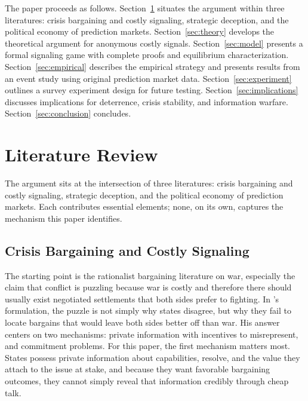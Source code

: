 \documentclass[12pt]{article}
\begin{document}
The paper proceeds as follows. Section~\ref{sec:lit} situates the argument within three literatures: crisis bargaining and costly signaling, strategic deception, and the political economy of prediction markets. Section~\ref{sec:theory} develops the theoretical argument for anonymous costly signals. Section~\ref{sec:model} presents a formal signaling game with complete proofs and equilibrium characterization. Section~\ref{sec:empirical} describes the empirical strategy and presents results from an event study using original prediction market data. Section~\ref{sec:experiment} outlines a survey experiment design for future testing. Section~\ref{sec:implications} discusses implications for deterrence, crisis stability, and information warfare. Section~\ref{sec:conclusion} concludes.


\section{Literature Review}\label{sec:lit}

The argument sits at the intersection of three literatures: crisis bargaining and costly signaling, strategic deception, and the political economy of prediction markets. Each contributes essential elements; none, on its own, captures the mechanism this paper identifies.

\subsection{Crisis Bargaining and Costly Signaling}

The starting point is the rationalist bargaining literature on war, especially the claim that conflict is puzzling because war is costly and therefore there should usually exist negotiated settlements that both sides prefer to fighting. In \citet{fearon1995}'s formulation, the puzzle is not simply why states disagree, but why they fail to locate bargains that would leave both sides better off than war. His answer centers on two mechanisms: private information with incentives to misrepresent, and commitment problems. For this paper, the first mechanism matters most. States possess private information about capabilities, resolve, and the value they attach to the issue at stake, and because they want favorable bargaining outcomes, they cannot simply reveal that information credibly through cheap talk.
\end{document}

